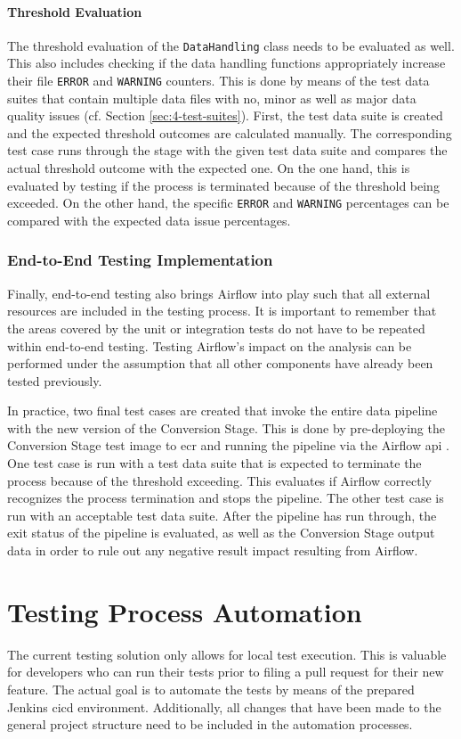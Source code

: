 \paragraph{Threshold Evaluation} The threshold evaluation of the \texttt{DataHandling} class needs to be evaluated as well. This also includes checking if the data handling functions appropriately increase their file \texttt{ERROR} and \texttt{WARNING} counters. This is done by means of the test data suites that contain multiple data files with no, minor as well as major data quality issues (cf. Section \ref{sec:4-test-suites}). First, the test data suite is created and the expected threshold outcomes are calculated manually. The corresponding test case runs through the stage with the given test data suite and compares the actual threshold outcome with the expected one. On the one hand, this is evaluated by testing if the process is terminated because of the threshold being exceeded. On the other hand, the specific \texttt{ERROR} and \texttt{WARNING} percentages can be compared with the expected data issue percentages.

\subsubsection{End-to-End Testing Implementation}
Finally, end-to-end testing also brings Airflow into play such that all external resources are included in the testing process. It is important to remember that the areas covered by the unit or integration tests do not have to be repeated within end-to-end testing. Testing Airflow's impact on the analysis can be performed under the assumption that all other components have already been tested previously.

In practice, two final test cases are created that invoke the entire data pipeline with the new version of the Conversion Stage. This is done by pre-deploying the Conversion Stage test image to \ac{ecr} and running the pipeline via the Airflow \acs{api} \cite{airflow}. One test case is run with a test data suite that is expected to terminate the process because of the threshold exceeding. This evaluates if Airflow correctly recognizes the process termination and stops the pipeline. The other test case is run with an acceptable test data suite. After the pipeline has run through, the exit status of the pipeline is evaluated, as well as the Conversion Stage output data in order to rule out any negative result impact resulting from Airflow. 

\section{Testing Process Automation}
The current testing solution only allows for local test execution. This is valuable for developers who can run their tests prior to filing a pull request for their new feature. The actual goal is to automate the tests by means of the prepared Jenkins \ac{cicd} environment. Additionally, all changes that have been made to the general project structure need to be included in the automation processes.

